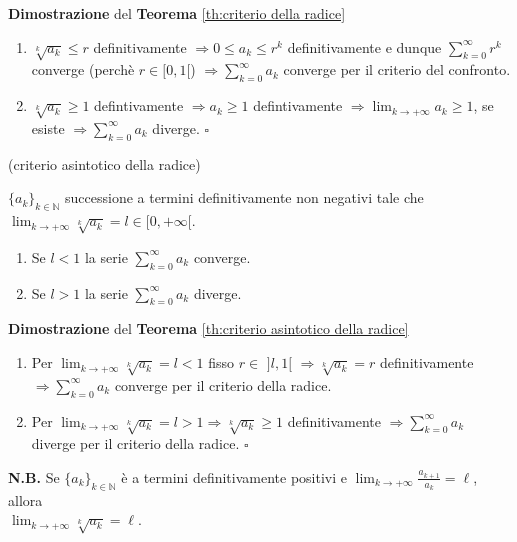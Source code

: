 \begin{dembar}
	\textbf{Dimostrazione} del \textbf{Teorema} \ref{th:criterio della radice} 
	
	\begin{enumerate}
		\item $\sqrt[k]{a_k}\leq r$ definitivamente $\Rightarrow 0 \leq a_k \leq r^k$ definitivamente e dunque $\sum_{k=0}^{\infty} r^k$ converge (perchè $r \in [0,1[$) $\Rightarrow \sum_{k=0}^{\infty} a_k$ converge per il criterio del confronto.
		
		\item $\sqrt[k]{a_k} \geq 1$ defintivamente $\Rightarrow a_k \geq 1$ defintivamente $\Rightarrow \lim_{k \rightarrow + \infty} a_k \geq 1$, se esiste $\Rightarrow \sum_{k=0}^{\infty} a_k$ diverge. $\square$ 
	\end{enumerate}
\end{dembar}


\begin{theorem} (criterio asintotico della radice) 
	
	\label{th:criterio asintotico della radice}
	$\{a_k\}_{k \in \mathbb{N}}$ successione a termini definitivamente non negativi tale che $\lim_{k \rightarrow +\infty} \sqrt[k]{a_k} = l \in [0,+\infty[$.
	\begin{enumerate}
		\item Se $l<1$ la serie $ \sum_{k=0}^{\infty} a_k$ converge.
		\item Se $l> 1$ la serie $\sum_{k=0}^{\infty} a_k$ diverge.
	\end{enumerate}
\end{theorem}


\begin{dembar}
	\textbf{Dimostrazione} del \textbf{Teorema} \ref{th:criterio asintotico della radice} 
	\begin{enumerate}
		\item Per $\lim_{k \rightarrow +\infty} \sqrt[k]{a_k} = l < 1$ fisso $r\in \,\,]l,1[\,\, \Rightarrow \sqrt[k]{a_k} =r$  definitivamente $\Rightarrow \sum_{k=0}^{\infty} a_k$ converge per il criterio della radice.
		\item Per $\lim_{k \rightarrow +\infty} \sqrt[k]{a_k} = l > 1 \Rightarrow \sqrt[k]{a_k}\geq 1$ definitivamente  $\Rightarrow \sum_{k=0}^{\infty} a_k$ diverge per il criterio della radice. $\square$
	\end{enumerate}
\end{dembar}


\begin{attbar}
	\textbf{N.B.} Se $\{a_k\}_{k \in \mathbb{N}}$ è a termini definitivamente positivi e  $\lim_{k \rightarrow +\infty} \frac{a_{k+1}}{a_k} = \ell$, allora \\ $\lim_{k \rightarrow +\infty} \sqrt[k]{a_k} = \ell$.
\end{attbar}


